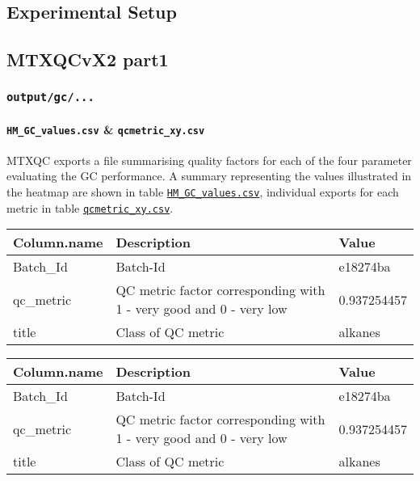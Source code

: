 \documentclass[]{book}
\let\oldparagraph\paragraph
\renewcommand{\paragraph}[1]{\oldparagraph{#1}\mbox{}}
\begin{document}
\hypertarget{experimental-setup}{%
\subsection{Experimental Setup}\label{experimental-setup}}

\hypertarget{mtxqcvx2-part1}{%
\subsection{MTXQCvX2 part1}\label{mtxqcvx2-part1}}

\hypertarget{outputgc...}{%
\subsubsection{\texorpdfstring{\texttt{output/gc/...}}{output/gc/...}}\label{outputgc...}}

\hypertarget{hm_gc_values.csv-qcmetric_xy.csv}{%
\paragraph{\texorpdfstring{\texttt{HM\_GC\_values.csv} \& \texttt{qcmetric\_xy.csv}}{HM\_GC\_values.csv \& qcmetric\_xy.csv}}\label{hm_gc_values.csv-qcmetric_xy.csv}}

MTXQC exports a file summarising quality factors for each of the four parameter evaluating the GC performance. A summary representing the values illustrated in the heatmap are shown in table \href{@ref(tab:o_hm_gc)}{\texttt{HM\_GC\_values.csv}}, individual exports for each metric in table \href{@ref(tab:o_gc_metric)}{\texttt{qcmetric\_xy.csv}}.

\begin{tabu} to 
\toprule
Column.name & Description & Value\\
\midrule
{}  Batch\_Id & Batch-Id & e18274ba\\
qc\_metric & QC metric factor corresponding with 1 - very good and 0 - very low & 0.937254457\\
  title & Class of QC metric & alkanes\\
\bottomrule
\end{tabu}

\begin{tabu} to 
\toprule
Column.name & Description & Value\\
\midrule
{}  Batch\_Id & Batch-Id & e18274ba\\
qc\_metric & QC metric factor corresponding with 1 - very good and 0 - very low & 0.937254457\\
  title & Class of QC metric & alkanes\\
\bottomrule
\end{tabu}
\end{document}
